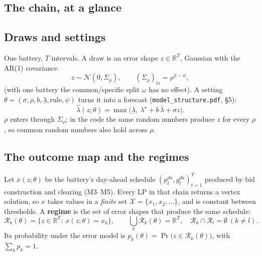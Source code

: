 \documentclass[10pt,a4paper]{article}
\newcommand{\code}[1]{\texttt{#1}}
\newcommand{\lamstar}{\lambda^{\star}}
\newcommand{\lamhat}{\hat\lambda}
\newcommand{\R}{\mathcal R}
\begin{document}
\subsection{The chain, at a glance}
\begin{center}
\end{center}

\subsection{Draws and settings}
One battery, $T$ intervals. A draw is an error shape $z\in\mathbb R^T$, Gaussian with the AR(1) covariance
\[
z\sim\mathcal N(0,\Sigma_\rho),\qquad (\Sigma_\rho)_{ts}=\rho^{|t-s|},
\]
(with one battery the common/specific split $\omega$ has no effect). A setting $\theta=(\sigma,\rho,b,
\underline\lambda,\text{rule},\psi)$ turns it into a forecast (\code{model\_structure.pdf}, \S5):
\[
\lamhat(z;\theta)=\max\big(\underline\lambda,\ \lamstar+b\,\bar\lambda+\sigma z\big).
\]
$\rho$ enters through $\Sigma_\rho$; in the code the same random numbers produce $z$ for every $\rho$, so
common random numbers also hold across $\rho$.

\subsection{The outcome map and the regimes}
Let $x(z;\theta)$ be the battery's day-ahead schedule $(p^{da}_t,g^{da}_t)_{t=1}^T$ produced by bid
construction and clearing (M3--M5). Every LP in that chain returns a vertex solution, so $x$ takes values in
a \emph{finite} set $\mathcal X=\{x_1,x_2,\dots\}$, and is constant between thresholds. A \textbf{regime} is
the set of error shapes that produce the same schedule:
\[
\R_k(\theta)=\{z\in\mathbb R^T:\ x(z;\theta)=x_k\},\qquad
\textstyle\bigcup_k\R_k(\theta)=\mathbb R^T,\quad \R_k\cap\R_l=\emptyset\ (k\ne l).
\]
Its probability under the error model is $p_k(\theta)=\Pr\big(z\in\R_k(\theta)\big)$, with $\sum_kp_k=1$.
\end{document}

